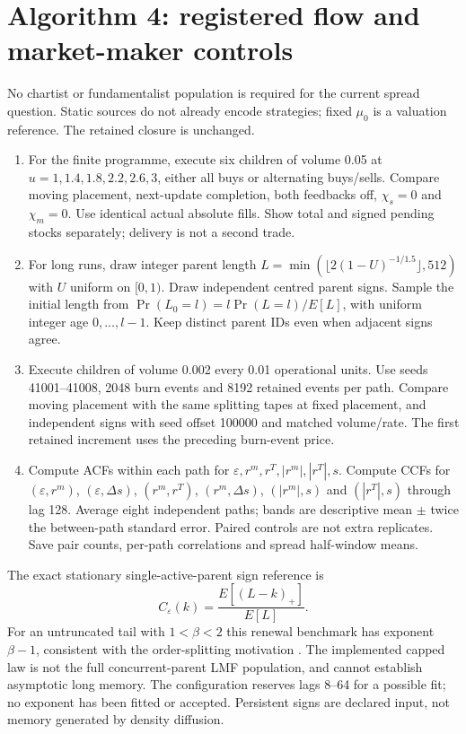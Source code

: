 \documentclass[11pt,a4paper]{article}
\begin{document}
\section{Algorithm 4: registered flow and market-maker controls}
No chartist or fundamentalist population is required for the current spread
question. Static sources do not already encode strategies; fixed $\mu_0$
is a valuation reference. The retained closure is unchanged.
\begin{enumerate}
\item For the finite programme, execute six children of volume 0.05 at
$u=1,1.4,1.8,2.2,2.6,3$, either all buys or alternating buys/sells.
Compare moving placement, next-update completion, both feedbacks off,
$\chi_s=0$ and $\chi_m=0$. Use identical actual absolute fills. Show
total and signed pending stocks separately; delivery is not a second trade.
\item For long runs, draw integer parent length
$L=\min(\lfloor2(1-U)^{-1/1.5}\rfloor,512)$ with $U$ uniform on $[0,1)$.
Draw independent centred parent signs. Sample the initial length from
$\Pr(L_0=l)=l\Pr(L=l)/E[L]$, with uniform integer age $0,\ldots,l-1$.
Keep distinct parent IDs even when adjacent signs agree.
\item Execute children of volume 0.002 every 0.01 operational units.
Use seeds 41001--41008, 2048 burn events and 8192 retained events per path.
Compare moving placement with the same splitting tapes at fixed placement,
and independent signs with seed offset 100000 and matched volume/rate.
The first retained increment uses the preceding burn-event price.
\item Compute ACFs within each path for $\varepsilon,r^m,r^T,|r^m|,|r^T|,s$.
Compute CCFs for $(\varepsilon,r^m)$, $(\varepsilon,\Delta s)$, $(r^m,r^T)$,
$(r^m,\Delta s)$, $(|r^m|,s)$ and $(|r^T|,s)$ through lag 128.
Average eight independent paths; bands are descriptive mean $\pm$ twice
the between-path standard error. Paired controls are not extra replicates.
Save pair counts, per-path correlations and spread half-window means.
\end{enumerate}
The exact stationary single-active-parent sign reference is
\[
 C_\varepsilon(k)=\frac{E[(L-k)_+]}{E[L]}.
\]
For an untruncated tail with $1<\beta<2$ this renewal benchmark has exponent
$\beta-1$, consistent with the order-splitting motivation \cite{lmf}.
The implemented capped law is not the full concurrent-parent LMF population,
and cannot establish asymptotic long memory. The configuration reserves
lags 8--64 for a possible fit; no exponent has been fitted or accepted.
Persistent signs are declared input, not memory generated by density diffusion.
\end{document}
